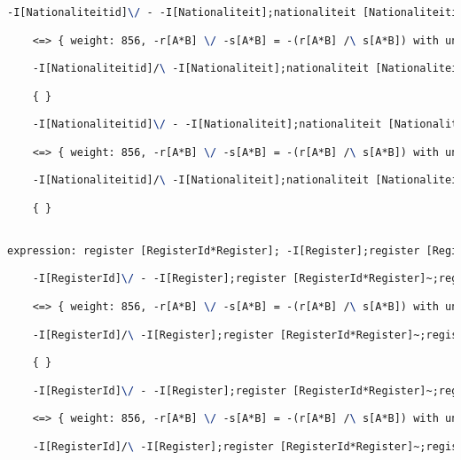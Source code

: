 \begin{lstlisting}[language=TeX]
    -I[Nationaliteitid]\/ - -I[Nationaliteit];nationaliteit [Nationaliteitid*Nationaliteit]~;nationaliteit [Nationaliteitid*Nationaliteit]

    <=> { weight: 856, -r[A*B] \/ -s[A*B] = -(r[A*B] /\ s[A*B]) with unifier: {A->I[Nationaliteitid], B->I[Nationaliteitid], r->nationaliteit [Nationaliteitid*Nationaliteit];-I[Nationaliteit];nationaliteit [Nationaliteitid*Nationaliteit]~, s->I[Nationaliteitid]} }

    -I[Nationaliteitid]/\ -I[Nationaliteit];nationaliteit [Nationaliteitid*Nationaliteit]~;nationaliteit [Nationaliteitid*Nationaliteit]

    { }

    -I[Nationaliteitid]\/ - -I[Nationaliteit];nationaliteit [Nationaliteitid*Nationaliteit]~;nationaliteit [Nationaliteitid*Nationaliteit]

    <=> { weight: 856, -r[A*B] \/ -s[A*B] = -(r[A*B] /\ s[A*B]) with unifier: {A->I[Nationaliteitid], B->I[Nationaliteitid], r->I[Nationaliteitid], s->nationaliteit [Nationaliteitid*Nationaliteit];-I[Nationaliteit];nationaliteit [Nationaliteitid*Nationaliteit]~} }

    -I[Nationaliteitid]/\ -I[Nationaliteit];nationaliteit [Nationaliteitid*Nationaliteit]~;nationaliteit [Nationaliteitid*Nationaliteit]

    { }


expression: register [RegisterId*Register]; -I[Register];register [RegisterId*Register]~ |- -I[RegisterId]

    -I[RegisterId]\/ - -I[Register];register [RegisterId*Register]~;register [RegisterId*Register]

    <=> { weight: 856, -r[A*B] \/ -s[A*B] = -(r[A*B] /\ s[A*B]) with unifier: {A->I[RegisterId], B->I[RegisterId], r->register [RegisterId*Register];-I[Register];register [RegisterId*Register]~, s->I[RegisterId]} }

    -I[RegisterId]/\ -I[Register];register [RegisterId*Register]~;register [RegisterId*Register]

    { }

    -I[RegisterId]\/ - -I[Register];register [RegisterId*Register]~;register [RegisterId*Register]

    <=> { weight: 856, -r[A*B] \/ -s[A*B] = -(r[A*B] /\ s[A*B]) with unifier: {A->I[RegisterId], B->I[RegisterId], r->I[RegisterId], s->register [RegisterId*Register];-I[Register];register [RegisterId*Register]~} }

    -I[RegisterId]/\ -I[Register];register [RegisterId*Register]~;register [RegisterId*Register]


\end{lstlisting}
